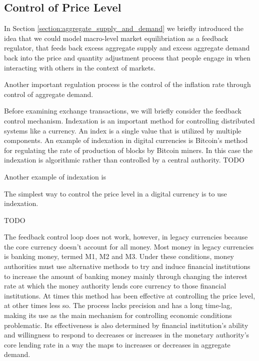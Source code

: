 \subsection{Control of Price Level}
\label{subsection:control_of_price_level}

In Section \ref{section:aggregate_supply_and_demand} we briefly introduced the idea that we could model
macro-level market equilibriation as a feedback regulator, that feeds back excess aggregate supply
and excess aggregate demand back into the price and quantity adjustment process that people engage
in when interacting with others in the context of markets. 

Another important regulation process is the control of the inflation rate through control of
aggregate demand.

Before examining exchange transactions, we will briefly consider the feedback control mechanism.
Indexation is an important method for controlling distributed systems like a currency. An index is a
single value that is utilized by multiple components. An example of indexation in digital currencies
is Bitcoin's method for regulating the rate of production of blocks by Bitcoin miners. In this case
the indexation is algorithmic rather than controlled by a central authority. TODO

Another example of indexation is 

The simplest way to control the price level in a digital currency is to use indexation.





TODO

The feedback control loop does not work, however, in legacy currencies because the core currency
doesn't account for all money. Most money in legacy currencies is banking money, termed M1, M2 and
M3. Under these conditions, money authorities must use alternative methods to try and induce
financial institutions to increase the amount of banking money mainly through changing the interest
rate at which the money authority lends core currency to those financial institutions. At times this
method has been effective at controlling the price level, at other times less so. The process lacks
precision and has a long time-lag, making its use as the main mechanism for controlling economic
conditions problematic. Its effectiveness is also determined by financial institution's ability and
willingness to respond to decreases or increases in the monetary authority's core lending rate in a
way the maps to increases or decreases in aggregate demand.

